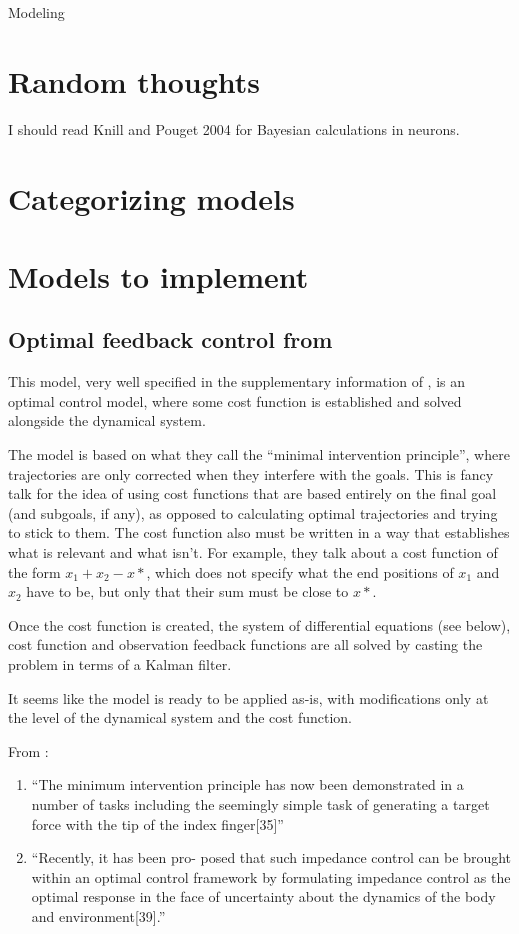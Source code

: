 \documentclass{report}
\begin{document}
\begin{chapter}{Modeling}
\section{Random thoughts}
I should read Knill and Pouget 2004 for Bayesian calculations in neurons.

\section{Categorizing models}

\section{Models to implement}
\subsection{Optimal feedback control from \cite{Todorov_Optimal_2002}}
\label{subsec:todorov-2002}
This model, very well specified in the supplementary information of \cite{Todorov_Optimal_2002}, is an optimal control model, where some cost function is established and solved alongside the dynamical system.

The model is based on what they call the ``minimal intervention principle'', where trajectories are only corrected when they interfere with the goals. This is fancy talk for the idea of using cost functions that are based entirely on the final goal (and subgoals, if any), as opposed to calculating optimal trajectories and trying to stick to them. The cost function also must be written in a way that establishes what is relevant and what isn't. For example, they talk about a cost function of the form $x_1 + x_2 - x*$, which does not specify what the end positions of $x_1$ and $x_2$ have to be, but only that their sum must be close to $x*$.

Once the cost function is created, the system of differential equations (see below), cost function and observation feedback functions are all solved by casting the problem in terms of a Kalman filter.

It seems like the model is ready to be applied as-is, with modifications only at the level of the dynamical system and the cost function.

From \cite{Wolpert_Principles_2011}:
\begin{enumerate}
\item ``The minimum intervention principle has now
been demonstrated in a number of tasks including the seemingly simple task of
generating a target force with the tip of the index finger[35]''
\item ``Recently, it has been pro- posed that such impedance control can be
brought within an optimal control framework by formulating impedance control as
the optimal response in the face of uncertainty about the dynamics of the body
and environment[39].''
\end{enumerate}


\end{chapter}
\end{document}
